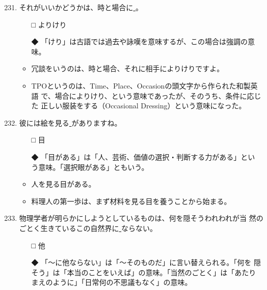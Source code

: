 \documentclass[
uplatex,
b5paper,
10pt,
dvipdfmx
]{jsbook}
\begin{document}
\begin{enumerate}
\setcounter{enumi}{230}
\setcounter{footnote}{0}

 \item それがいいかどうかは、時と場合に\underline{   }。 

 \begin{itemize}
  \item[□] よりけり
  \item[◆] 「けり」は古語では過去や詠嘆を意味するが、この場合は強調の意味。

 \end{itemize}

 \begin{itemize}
  \item 冗談をいうのは、時と場合、それに相手によりけりですよ。
  \item TPOというのは、Time、Place、Occasionの頭文字から作られた和製英語
	で、場合によりけり、という意味であったが、そのうち、条件に応じた
	正しい服装をする（Occasional Dressing）という意味になった。
 \end{itemize}

 \item 彼には絵を見る\underline{   }がありますね。

 \begin{itemize}
  \item[□] 目
  \item[◆] 「目がある」は「人、芸術、価値の選択・判断する力がある」とい
      う意味。「選択眼がある」ともいう。
 \end{itemize}

 \begin{itemize}
  \item 人を見る目がある。
  \item 料理人の第一歩は、まず材料を見る目を養うことから始まる。
 \end{itemize}

 \item 物理学者が明らかにしようとしているものは、何を隠そうわれわれが当
       然のごとく生きているこの自然界に\underline{   }ならない。

 \begin{itemize}
  \item[□] 他
  \item[◆] 「〜に他ならない」は「〜そのものだ」に言い替えられる。「何を
      隠そう」は「本当のことをいえば」の意味。「当然のごとく」は「あたり
      まえのように」「日常何の不思議もなく」の意味。
 \end{itemize}


\end{enumerate}
\end{document}
